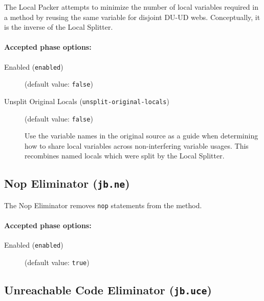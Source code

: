 \documentclass{article}
\begin{document}
The Local Packer attempts to minimize the number of local
variables required in a method by reusing the same variable for
disjoint DU-UD webs. Conceptually, it is the inverse of the
Local Splitter.


\paragraph{Accepted phase options:} 

\begin{description}

\item[Enabled ({\tt enabled})]
(default value: {\tt false})






\item[Unsplit Original Locals ({\tt unsplit-original-locals})]
(default value: {\tt false})




Use the variable names in the original source as a guide when
determining how to share local variables across non-interfering
variable usages. This recombines named locals which were split by
the Local Splitter. 



\end{description}

\subsection{Nop Eliminator ({\tt jb.ne})}

The Nop Eliminator removes {\tt nop} statements from the method.


\paragraph{Accepted phase options:} 

\begin{description}

\item[Enabled ({\tt enabled})]
(default value: {\tt true})






\end{description}

\subsection{Unreachable Code Eliminator ({\tt jb.uce})}
\end{document}
